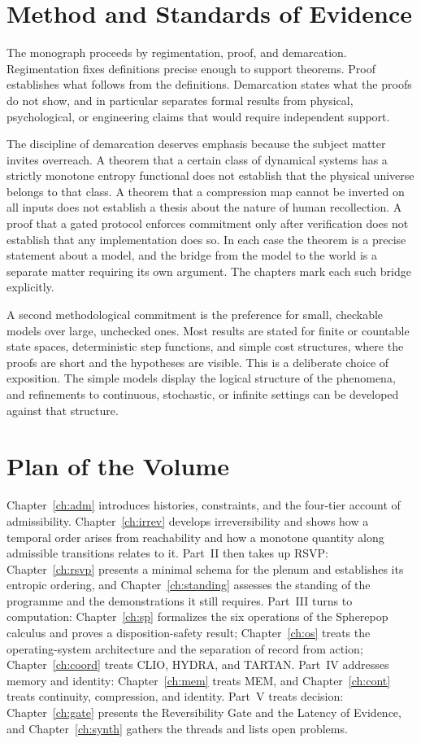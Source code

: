 \documentclass[11pt,twoside,openright]{book}
\theoremstyle{plain}
\theoremstyle{definition}
\theoremstyle{remark}
\newcommand{\memeight}{\mbox{MEM\textbar 8}}
\newcommand{\rsvp}{RSVP}
\begin{document}
\section{Method and Standards of Evidence}

The monograph proceeds by regimentation, proof, and demarcation. Regimentation fixes definitions precise enough to support theorems. Proof establishes what follows from the definitions. Demarcation states what the proofs do not show, and in particular separates formal results from physical, psychological, or engineering claims that would require independent support.

The discipline of demarcation deserves emphasis because the subject matter invites overreach. A theorem that a certain class of dynamical systems has a strictly monotone entropy functional does not establish that the physical universe belongs to that class. A theorem that a compression map cannot be inverted on all inputs does not establish a thesis about the nature of human recollection. A proof that a gated protocol enforces commitment only after verification does not establish that any implementation does so. In each case the theorem is a precise statement about a model, and the bridge from the model to the world is a separate matter requiring its own argument. The chapters mark each such bridge explicitly.

A second methodological commitment is the preference for small, checkable models over large, unchecked ones. Most results are stated for finite or countable state spaces, deterministic step functions, and simple cost structures, where the proofs are short and the hypotheses are visible. This is a deliberate choice of exposition. The simple models display the logical structure of the phenomena, and refinements to continuous, stochastic, or infinite settings can be developed against that structure.

\section{Plan of the Volume}

Chapter~\ref{ch:adm} introduces histories, constraints, and the four-tier account of admissibility. Chapter~\ref{ch:irrev} develops irreversibility and shows how a temporal order arises from reachability and how a monotone quantity along admissible transitions relates to it. Part~II then takes up \rsvp{}: Chapter~\ref{ch:rsvp} presents a minimal schema for the plenum and establishes its entropic ordering, and Chapter~\ref{ch:standing} assesses the standing of the programme and the demonstrations it still requires. Part~III turns to computation: Chapter~\ref{ch:sp} formalizes the six operations of the Spherepop calculus and proves a disposition-safety result; Chapter~\ref{ch:os} treats the operating-system architecture and the separation of record from action; Chapter~\ref{ch:coord} treats CLIO, HYDRA, and TARTAN. Part~IV addresses memory and identity: Chapter~\ref{ch:mem} treats \memeight{}, and Chapter~\ref{ch:cont} treats continuity, compression, and identity. Part~V treats decision: Chapter~\ref{ch:gate} presents the Reversibility Gate and the Latency of Evidence, and Chapter~\ref{ch:synth} gathers the threads and lists open problems.
\end{document}
